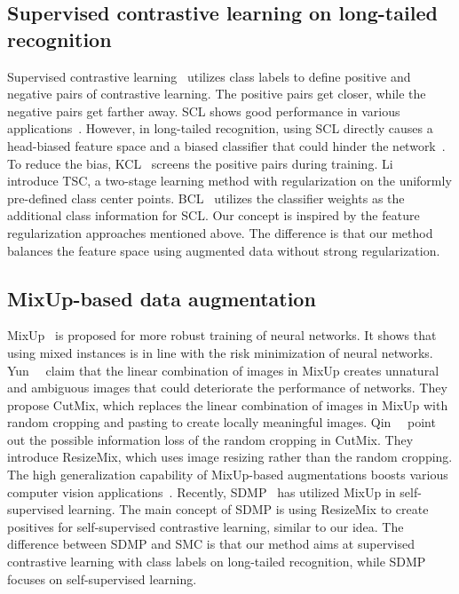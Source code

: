 \documentclass[10pt,twocolumn,letterpaper]{article}
\begin{document}
\subsection{Supervised contrastive learning on long-tailed recognition}
Supervised contrastive learning~\cite{khosla2020supervised} utilizes class labels to define positive and negative pairs of contrastive learning.
The positive pairs get closer, while the negative pairs get farther away.
SCL shows good performance in various applications~\cite{khosla2020supervised, liu2021learning, Zhao_2022_CVPR}.
However, in long-tailed recognition, using SCL directly causes a head-biased feature space and a biased classifier that could hinder the network~\cite{KCL}. To reduce the bias, KCL~\cite{KCL} screens the positive pairs during training. Li~\etal~\cite{TSC} introduce TSC, a two-stage learning method with regularization on the uniformly pre-defined class center points.
BCL~\cite{BCL} utilizes the classifier weights as the additional class information for SCL.
Our concept is inspired by the feature regularization approaches mentioned above.
The difference is that our method balances the feature space using augmented data without strong regularization.


\subsection{MixUp-based data augmentation}
MixUp~\cite{MixUp} is proposed for more robust training of neural networks. It shows that using mixed instances is in line with the risk minimization of neural networks.
Yun~\etal~\cite{CutMix} claim that the linear combination of images in MixUp creates unnatural and ambiguous images that could deteriorate the performance of networks. They propose CutMix, which replaces the linear combination of images in MixUp with random cropping and pasting to create locally meaningful images.
Qin~\etal~\cite{ResizeMix} point out the possible information loss of the random cropping in CutMix.
They introduce ResizeMix, which uses image resizing rather than the random cropping.
The high generalization capability of MixUp-based augmentations boosts various computer vision applications~\cite{mangla2020charting, CMO}.
Recently, SDMP~\cite{Ren_2022_CVPR} has utilized MixUp in self-supervised learning. The main concept of SDMP is using ResizeMix to create positives for self-supervised contrastive learning, similar to our idea.
The difference between SDMP and SMC is that our method aims at supervised contrastive learning with class labels on long-tailed recognition, while SDMP focuses on self-supervised learning.
\end{document}

